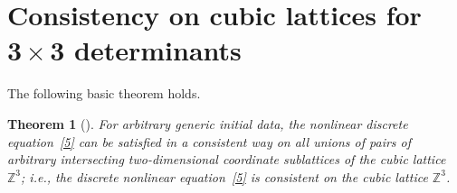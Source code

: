 \documentclass[11pt]{article}
\newtheorem{theorem}{Theorem}
\begin{document}
\section[Consistency on cubic lattices for $3 \times 3$ determinants]{Consistency on cubic lattices for $\boldsymbol{3 \times 3}$ determinants}




The following basic theorem holds.



\begin{theorem}[\cite{1}] \label{theorem1}
For arbitrary generic initial data, the
nonlinear discrete equation~\eqref{5} can be satisfied in a
consistent way on all unions of pairs of arbitrary intersecting
two-dimensional coordinate sublattices of the cubic lattice
$\mathbb{Z}^3$; i.e., the discrete nonlinear equation~\eqref{5}
is consistent on the cubic lattice $\mathbb{Z}^3$.
\end{theorem}
\end{document}
